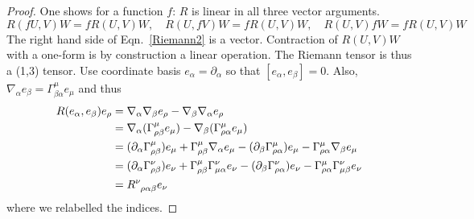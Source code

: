 \documentclass[a4paper]{article}
\theoremstyle{new}
\begin{document}
\begin{proof}
One shows for a function $f$: $R$ is linear in all three vector arguments.
$$R(fU,V)W=fR(U,V)W,\quad R(U,fV)W=fR(U,V)W,\quad R(U,V)fW=fR(U,V)W$$
The right hand side of Eqn.~\ref{Riemann2} is a vector. Contraction of $R(U,V)W$ with a one-form is by construction a linear operation. The Riemann tensor is thus a (1,3) tensor. Use coordinate basis $e_\alpha=\partial_\alpha$ so that $[e_\alpha,e_\beta]=0$. Also, $\nabla_\alpha e_\beta=\Gamma_{\beta\alpha}^\mu e_\mu$ and thus
\begin{align}
R(e_\alpha,e_\beta)e_\rho&=\nabla_\alpha\nabla_\beta e_\rho-\nabla_\beta\nabla_\alpha e_\rho\nonumber\\&=\nabla_\alpha(\Gamma^\mu_{\rho\beta}e_\mu)-\nabla_\beta(\Gamma^\mu_{\rho\alpha}e_\mu)\nonumber\\&=(\partial_\alpha\Gamma^\mu_{\rho\beta})e_\mu+\Gamma_{\rho\beta}^\mu\nabla_\alpha e_\mu-(\partial_\beta\Gamma_{\rho\alpha}^\mu)e_\mu-\Gamma^\mu_{\rho\alpha}\nabla_\beta e_\mu\nonumber\\&=(\partial_\alpha\Gamma^\nu_{\rho\beta})e_\nu+\Gamma_{\rho\beta}^\mu\Gamma^\nu_{\mu\alpha}e_\nu-(\partial_\beta\Gamma_{\rho\alpha}^\nu)e_\nu-\Gamma^\mu_{\rho\alpha}\Gamma^\nu_{\mu\beta}e_\nu\nonumber\\&=\tensor*{R}{*_{}^{\nu}_{\rho\alpha\beta}}e_\nu\nonumber
\end{align}
where we relabelled the indices.
\end{proof}
\newpage
\end{document}
